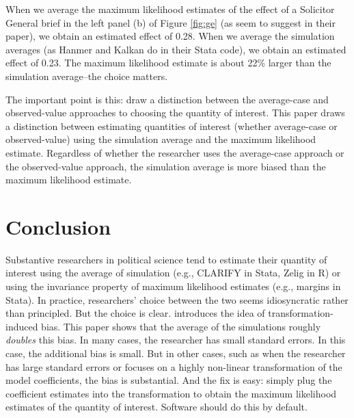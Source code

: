 \documentclass[10pt]{article}
\begin{document}
When we average the maximum likelihood estimates of the effect of a Solicitor General brief in the left panel (b) of Figure \ref{fig:ge} (as \cite{HanmerKalkan2013} seem to suggest in their paper), we obtain an estimated effect of 0.28. 
When we average the simulation averages (as Hanmer and Kalkan do in their Stata code), we obtain an estimated effect of 0.23. 
The maximum likelihood estimate is about 22\% larger than the simulation average--the choice matters.

The important point is this: \cite{HanmerKalkan2013} draw a distinction between the average-case and observed-value approaches to choosing the quantity of interest. 
This paper draws a distinction between estimating quantities of interest (whether average-case or observed-value) using the simulation average and the maximum likelihood estimate. 
Regardless of whether the researcher uses the average-case approach or the observed-value approach, the simulation average is more biased than the maximum likelihood estimate.

\section*{Conclusion}

Substantive researchers in political science tend to estimate their quantity of interest using the average of simulation (e.g., CLARIFY in Stata, Zelig in R) or using the invariance property of maximum likelihood estimates (e.g., margins in Stata). 
In practice, researchers' choice between the two seems idiosyncratic rather than principled. 
But the choice is clear. 
\cite{Rainey2017} introduces the idea of transformation-induced bias. 
This paper shows that the average of the simulations roughly \textit{doubles} this bias.
In many cases, the researcher has small standard errors. 
In this case, the additional bias is small. 
But in other cases, such as when the researcher has large standard errors or focuses on a highly non-linear transformation of the model coefficients, the bias is substantial. 
And the fix is easy: simply plug the coefficient estimates into the transformation to obtain the maximum likelihood estimates of the quantity of interest. 
Software should do this by default. 


\singlespace 
\small


\end{document}
